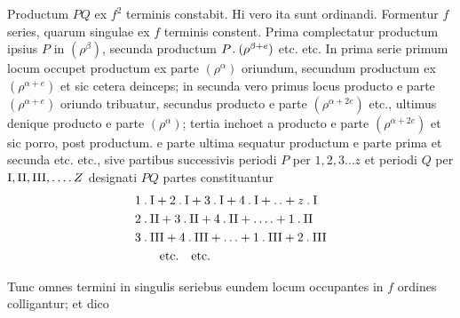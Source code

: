Productum $PQ$ ex $f^2$ terminis constabit. Hi vero ita sunt ordinandi. Formentur $f$ series, quarum singulae ex $f$ terminis constent. Prima complectatur productum ipsius $P$ in $(\rho^\beta)$, secunda productum $P\mathbin{.}(\rho^{\beta+e})$ etc. etc. In prima serie primum locum occupet productum ex parte $(\rho^\alpha)$ oriundum, secundum productum ex $(\rho^{\alpha+e})$ et sic cetera deinceps; in secunda vero primus locus producto e parte $(\rho^{\alpha+e})$ oriundo tribuatur, secundus producto e parte $(\rho^{\alpha+2e})$ etc., ultimus denique producto e parte $(\rho^\alpha)$; tertia inchoet a producto e parte $(\rho^{\alpha+2e})$ et sic porro, post productum. e parte ultima sequatur productum e parte prima et secunda etc. etc., sive partibus successivis periodi $P$ per $1,2,3\ldots z$ et periodi $Q$ per $\mathrm{I},\mathrm{II},\mathrm{III},\mathinner{.\,.\,.\,.} Z$ designati $PQ$ partes constituantur
\[
\begin{aligned}
&1\mathbin{.}\mathrm{I}+2\mathbin{.}\mathrm{I}+3\mathbin{.}\mathrm{I}+4\mathbin{.}\mathrm{I}+\mathinner{.\,.}+z\mathbin{.}\mathrm{I}\\
&2\mathbin{.}\mathrm{II}+3\mathbin{.}\mathrm{II}+4\mathbin{.}\mathrm{II}+\mathinner{.\,.\,.\,.}+1\mathbin{.}\mathrm{II}\\
&3\mathbin{.}\mathrm{III}+4\mathbin{.}\mathrm{III}+\ldots+1\mathbin{.}\mathrm{III}+2\mathbin{.}\mathrm{III}\\
&\qquad\text{etc.}\quad\text{etc.}
\end{aligned}
\]

Tunc omnes termini in singulis seriebus eundem locum occupantes in $f$ ordines colligantur; et dico

